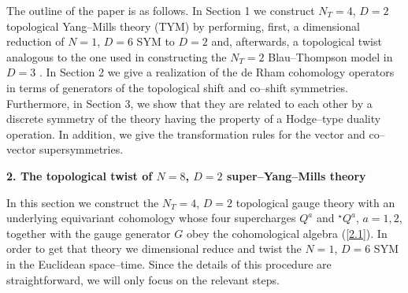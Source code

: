 \documentclass[a4paper,11pt]{article}
\begin{document}
The outline of the paper is as follows. In Section 1 we construct
$N_T = 4$, $D = 2$ topological Yang--Mills theory (TYM) by performing, first, 
a dimensional reduction of $N = 1$, $D = 6$ SYM to $D = 2$ and, afterwards,
a topological twist analogous to the one used in constructing the  
$N_T = 2$ Blau--Thompson model in $D = 3$ \cite{16}.
In Section 2 we give a realization of the de Rham cohomology operators in 
terms of generators of the topological shift and co--shift symmetries. 
Furthermore, in Section 3, we show that they are related to each other by a 
discrete 
symmetry of the theory having the property of a Hodge--type duality operation. 
In addition, we give the transformation rules for the vector and co--vector 
supersymmetries.
\bigskip
\begin{flushleft}
{\large{\bf 2. The topological twist of $N = 8$, $D = 2$ 
super--Yang--Mills theory}}
\end{flushleft}
\bigskip
In this section we construct the $N_T = 4$, $D = 2$ topological gauge theory 
with an underlying equivariant cohomology whose four supercharges
$Q^a$ and $^\star Q^a$, $a=1,2$, together with the gauge generator $G$ 
obey the cohomological algebra (\ref{2.1}). In order to get that theory
we dimensional reduce and twist the $N = 1$, $D = 6$ SYM 
in the Euclidean space--time. Since the details of this procedure are 
straightforward, we will only focus on the relevant steps.
\end{document}
